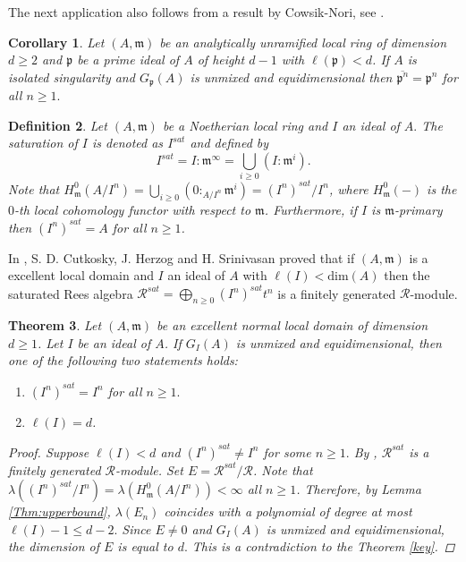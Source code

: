 \documentclass[11pt]{amsart}
\theoremstyle{plain}
\newtheorem{theorem}{Theorem}[section]
\newtheorem{corollary}[theorem]{Corollary}
\newtheorem{definition}[theorem]{Definition}
\newcommand{\p}{\mathfrak{p}}
\newcommand{\m}{\mathfrak{m}}
\newcommand{\R}{\mathcal{R}}
\theoremstyle{plain}
\begin{document}
The next application also follows from a result by Cowsik-Nori, see \cite[Proposition 3]{Cowsik}.
\begin{corollary}
      Let $(A,\m)$ be an analytically unramified local ring of dimension $d\geq 2$ and $\p$ be a prime ideal of $A$ of height $d-1$ with $\ell(\p)<d$. If $A$ is isolated singularity and ${G}_{\p}(A)$ is unmixed and equidimensional then $\overline{\p^n}={\p^n}$ for all $n\geq 1.$
\end{corollary}


\begin{definition}
\normalfont
    Let $(A,\m)$ be a Noetherian local ring and $I$ an ideal of $A.$ The saturation of $I$ is denoted as $I^{sat}$ and defined by $$I^{sat}=I:\m^{\infty}=\bigcup_{i\geq 0}(I:\m^i).$$ Note that $H^0_{\m}(A/I^n) = \bigcup_{i\geq 0}(0:_{A/I^n}\m^i)= (I^n)^{sat}/I^n$, where $H^0_{\m}(-)$ is the $0$-th local cohomology functor with respect to $\m$. Furthermore, if $I$ is $\m$-primary then $(I^n)^{sat}=A$ for all $n\geq 1$.
\end{definition}

In \cite[Theorem 2.1]{saturatedideal}, S. D. Cutkosky, J. Herzog and H. Srinivasan proved that if $(A,\m)$ is a excellent local domain and $I$ an ideal of $A$ with $\ell(I)<\text{dim}(A)$ then the saturated Rees algebra $\R^{sat}=\bigoplus_{n\geq 0}(I^n)^{sat}t^n$ is a finitely generated $\R$-module.
\begin{theorem}\label{thm:saturated}
    Let $(A,\m)$ be an excellent normal local domain of dimension $d\geq 1$. Let $I$ be an ideal of $A$. If ${G}_{I}(A)$ is unmixed and equidimensional, then one of the following two statements holds:
    \begin{enumerate}
        \item $(I^n)^{sat}=I^n$ for all $n\geq 1.$
        \item $\ell(I)=d$.
    \end{enumerate}
    \begin{proof}
        Suppose $\ell(I)<d$ and $(I^n)^{sat}\neq I^n$ for some $n\geq 1.$ By \cite[Theorem 2.1]{saturatedideal}, $\R^{sat}$ is a finitely generated $\R$-module. Set $E=\R^{sat}/\R$. Note that $\lambda((I^n)^{sat}/I^n)=\lambda(H^0_{\m}(A/I^n))<\infty$ all $n\geq 1$. Therefore, by Lemma \ref{Thm:upperbound}, $ \lambda(E_n)$ coincides with a polynomial of degree at most $\ell(I)-1\leq d-2.$ Since $E\neq 0$ and ${G}_{I}(A)$ is unmixed and equidimensional, the dimension of $E$ is equal to $d.$ This is a contradiction to the Theorem \ref{key}.
    \end{proof}
\end{theorem}
\end{document}
